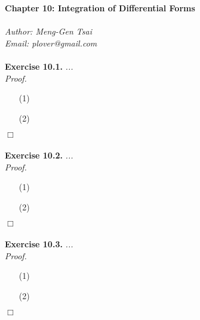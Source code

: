 \documentclass{article}
\begin{document}
\textbf{\Large Chapter 10: Integration of Differential Forms} \\\\



\emph{Author: Meng-Gen Tsai} \\
\emph{Email: plover@gmail.com} \\\\






\textbf{Exercise 10.1.}
\emph{...} \\

\emph{Proof.}
\begin{enumerate}
\item[(1)]
\item[(2)]

\end{enumerate}
$\Box$ \\\\






\textbf{Exercise 10.2.}
\emph{...} \\

\emph{Proof.}
\begin{enumerate}
\item[(1)]
\item[(2)]

\end{enumerate}
$\Box$ \\\\






\textbf{Exercise 10.3.}
\emph{...} \\

\emph{Proof.}
\begin{enumerate}
\item[(1)]
\item[(2)]

\end{enumerate}
$\Box$ \\\\
\end{document}
